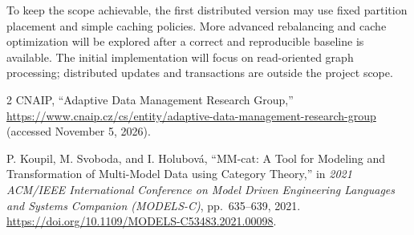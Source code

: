 \documentclass[a4paper]{article}
\begin{document}
To keep the scope achievable, the first distributed version may use fixed partition placement and simple caching policies. More advanced rebalancing and cache optimization will be explored after a correct and reproducible baseline is available. The initial implementation will focus on read-oriented graph processing; distributed updates and transactions are outside the project scope.

\begin{thebibliography}{2}
CNAIP, ``Adaptive Data Management Research Group,''
\url{https://www.cnaip.cz/cs/entity/adaptive-data-management-research-group} (accessed November 5, 2026).

P. Koupil, M. Svoboda, and I. Holubov\'{a},
``MM-cat: A Tool for Modeling and Transformation of Multi-Model Data using Category Theory,''
in \emph{2021 ACM/IEEE International Conference on Model Driven Engineering Languages and Systems Companion (MODELS-C)},
pp.~635--639, 2021.
\url{https://doi.org/10.1109/MODELS-C53483.2021.00098}.
\end{thebibliography}
\end{document}
